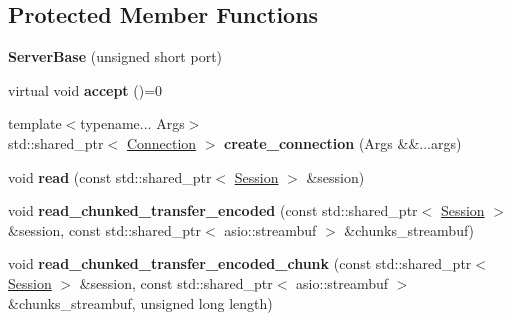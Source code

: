 \subsection*{Protected Member Functions}
\begin{DoxyCompactItemize}
\item 
{\bfseries Server\+Base} (unsigned short port)\hypertarget{classSimpleWeb_1_1ServerBase_a0921fc51a3c799f477facb41620cc86d}{}\label{classSimpleWeb_1_1ServerBase_a0921fc51a3c799f477facb41620cc86d}

\item 
virtual void {\bfseries accept} ()=0\hypertarget{classSimpleWeb_1_1ServerBase_a55c6ad458eee385419d4e25351c985b7}{}\label{classSimpleWeb_1_1ServerBase_a55c6ad458eee385419d4e25351c985b7}

\item 
{\footnotesize template$<$typename... Args$>$ }\\std\+::shared\+\_\+ptr$<$ \hyperlink{classSimpleWeb_1_1ServerBase_1_1Connection}{Connection} $>$ {\bfseries create\+\_\+connection} (Args \&\&...args)\hypertarget{classSimpleWeb_1_1ServerBase_a0dc0b1b4fa722955f6f1b7a7abdd8bd0}{}\label{classSimpleWeb_1_1ServerBase_a0dc0b1b4fa722955f6f1b7a7abdd8bd0}

\item 
void {\bfseries read} (const std\+::shared\+\_\+ptr$<$ \hyperlink{classSimpleWeb_1_1ServerBase_1_1Session}{Session} $>$ \&session)\hypertarget{classSimpleWeb_1_1ServerBase_a8ec3e4aa2495e439a3d08d210d20626e}{}\label{classSimpleWeb_1_1ServerBase_a8ec3e4aa2495e439a3d08d210d20626e}

\item 
void {\bfseries read\+\_\+chunked\+\_\+transfer\+\_\+encoded} (const std\+::shared\+\_\+ptr$<$ \hyperlink{classSimpleWeb_1_1ServerBase_1_1Session}{Session} $>$ \&session, const std\+::shared\+\_\+ptr$<$ asio\+::streambuf $>$ \&chunks\+\_\+streambuf)\hypertarget{classSimpleWeb_1_1ServerBase_a76062d608c2f62d4006dfb0c1b4d2315}{}\label{classSimpleWeb_1_1ServerBase_a76062d608c2f62d4006dfb0c1b4d2315}

\item 
void {\bfseries read\+\_\+chunked\+\_\+transfer\+\_\+encoded\+\_\+chunk} (const std\+::shared\+\_\+ptr$<$ \hyperlink{classSimpleWeb_1_1ServerBase_1_1Session}{Session} $>$ \&session, const std\+::shared\+\_\+ptr$<$ asio\+::streambuf $>$ \&chunks\+\_\+streambuf, unsigned long length)\hypertarget{classSimpleWeb_1_1ServerBase_a52e523f74e7cd30bf6e47807d1106798}{}\label{classSimpleWeb_1_1ServerBase_a52e523f74e7cd30bf6e47807d1106798}


\end{DoxyCompactItemize}
